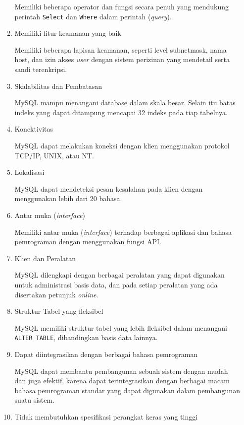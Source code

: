 \documentclass[a4paper,twoside]{article}
\begin{document}
\begin{enumerate}
\begin{enumerate}
			Memiliki beberapa operator dan fungsi secara penuh yang mendukung perintah \texttt{Select} dan \texttt{Where} dalam perintah (\textit{query}).
			\item Memiliki fitur keamanan yang baik
			
			Memiliki beberapa lapisan keamanan, seperti level subnetmask, nama host, dan izin akses \textit{user} dengan sistem perizinan yang mendetail serta sandi terenkripsi.
			
			\item Skalabilitas dan Pembatasan
			
			MySQL mampu menangani database dalam skala besar. Selain itu batas indeks yang dapat ditampung mencapai 32 indeks pada tiap tabelnya.
			
			\item Konektivitas
			
			MySQL dapat melakukan koneksi dengan klien menggunakan protokol TCP/IP, UNIX, atau NT.
			
			\item Lokalisasi
			
			MySQL dapat mendeteksi pesan kesalahan pada klien dengan menggunakan lebih dari 20 bahasa. 
			
			\item Antar muka (\textit{interface})
			
			Memiliki antar muka (\textit{interface}) terhadap berbagai aplikasi dan bahasa pemrograman dengan menggunakan fungsi API.
			
			\item Klien dan Peralatan
			
			MySQL dilengkapi dengan berbagai peralatan yang dapat digunakan untuk administrasi basis data, dan pada setiap peralatan yang ada disertakan petunjuk \textit{online}.
			
			\item Struktur Tabel yang fleksibel
			
			MySQL memiliki struktur tabel yang lebih fleksibel dalam menangani \texttt{ALTER TABLE}, dibandingkan basis data lainnya.
			
			\item Dapat diintegrasikan dengan berbagai bahasa pemrograman
			
			MySQL dapat membantu pembangunan sebuah sistem dengan mudah dan juga efektif, karena dapat terintegrasikan dengan berbagai macam bahasa pemrograman standar yang dapat digunakan dalam pembangunan suatu sistem.
			
			\item Tidak membutuhkan spesifikasi perangkat keras yang tinggi
			

\end{enumerate}
\end{enumerate}
\end{document}

